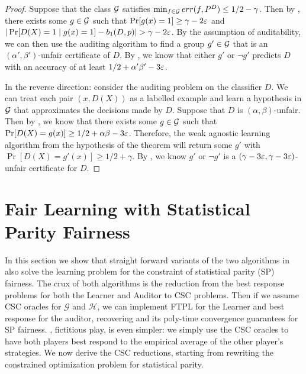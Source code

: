 \begin{proof}
  Suppose that the class $\mathcal{G}$ satisfies
  $\min_{f\in \mathcal{G}} err(f, P^D) \leq 1/2 - \gamma$. Then by
  , there exists some $g\in \mathcal{G}$ such that
  $\Pr[g(x) = 1]\geq \gamma - 2\varepsilon$ and
  $|\Pr[D(X) = 1 \mid g(x) = 1] - b_1(D, p)| > \gamma - 2\varepsilon$.  By
  the assumption of auditability, we can then use the auditing
  algorithm to find a group $g'\in \mathcal{G}$ that is an
  $(\alpha', \beta')$-unfair certificate of $D$.  By ,
  we know that either $g'$ or $\neg g'$ predicts $D$ with an accuracy
  of at least $1/2 + \alpha'\beta' - 3\varepsilon$.


  In the reverse direction: consider the auditing problem on the
  classifier $D$.  We can treat each pair $(x, D(X))$ as a labelled
  example and learn a hypothesis in $\mathcal{G}$ that approximates the
  decisions made by $D$.  Suppose that $D$ is
  $(\alpha, \beta)$-unfair. Then by , we know that
  there exists some $g\in \mathcal{G}$ such that
  $\Pr[D(X) = g(x)] \geq 1/2 + \alpha\beta - 3\varepsilon$. Therefore, the
  weak agnostic learning algorithm from the hypothesis of the theorem
  will return some $g'$ with $\Pr[D(X) = g'(x)] \geq 1/2 + \gamma$. By
  , we know $g'$ or $\neg g'$ is a
  $(\gamma - 3\varepsilon, \gamma - 3\varepsilon)$-unfair certificate for $D$.
\end{proof}
\fi

\iffalse
\section{Fair Learning with Statistical Parity Fairness}


In this section we show that straight forward variants of the two algorithms in
 also solve the learning problem for the constraint of statistical parity (SP)
fairness. The crux of both algorithms is the reduction from the best response problems for both the Learner and Auditor
to CSC problems. Then if we assume CSC oracles for $\mathcal{G}$ and $\mathcal{H}$, we can implement FTPL for the Learner and best response for the auditor, recovering  and its poly-time convergence guarantees for SP fairness. , fictitious play, is even simpler: we simply use the CSC oracles to have both players best respond to the empirical average of the other player's strategies. We now derive the CSC reductions, starting from rewriting the constrained optimization problem for statistical parity.

